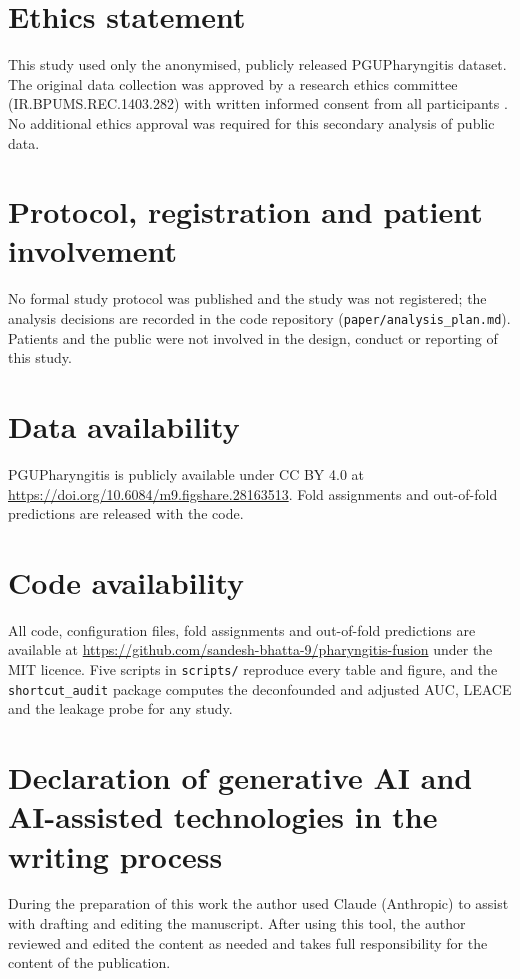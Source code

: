 \documentclass[preprint,12pt]{elsarticle}
\begin{document}
\section*{Ethics statement}
This study used only the anonymised, publicly released PGUPharyngitis dataset. The original data collection was approved by a research ethics committee (IR.BPUMS.REC.1403.282) with written informed consent from all participants \cite{shojaei2025pgu}. No additional ethics approval was required for this secondary analysis of public data.

\section*{Protocol, registration and patient involvement}
No formal study protocol was published and the study was not registered; the analysis decisions are recorded in the code repository (\texttt{paper/analysis\_plan.md}). Patients and the public were not involved in the design, conduct or reporting of this study.

\section*{Data availability}
PGUPharyngitis is publicly available under CC BY 4.0 at \url{https://doi.org/10.6084/m9.figshare.28163513}. Fold assignments and out-of-fold predictions are released with the code.

\section*{Code availability}
All code, configuration files, fold assignments and out-of-fold predictions are available at \url{https://github.com/sandesh-bhatta-9/pharyngitis-fusion} under the MIT licence. Five scripts in \texttt{scripts/} reproduce every table and figure, and the \texttt{shortcut\_audit} package computes the deconfounded and adjusted AUC, LEACE and the leakage probe for any study.

\section*{Declaration of generative AI and AI-assisted technologies in the writing process}
During the preparation of this work the author used Claude (Anthropic) to assist with drafting and editing the manuscript. After using this tool, the author reviewed and edited the content as needed and takes full responsibility for the content of the publication.
\end{document}
